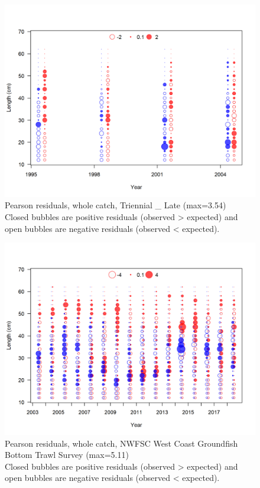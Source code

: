 \documentclass[12pt,]{article}
\begin{document}
\begin{figure}
\centering
\includegraphics{r4ss/plots_mod1/comp_lenfit_residsflt6mkt0.png}
\caption{Pearson residuals, whole catch, Triennial \_ Late (max=3.54)\\
Closed bubbles are positive residuals (observed \textgreater{} expected)
and open bubbles are negative residuals (observed \textless{} expected).
\label{fig:tri_late_len_pearson}}
\end{figure}

\begin{figure}
\centering
\includegraphics{r4ss/plots_mod1/comp_lenfit_residsflt7mkt0.png}
\caption{Pearson residuals, whole catch, NWFSC West Coast Groundfish
Bottom Trawl Survey (max=5.11)\\
Closed bubbles are positive residuals (observed \textgreater{} expected)
and open bubbles are negative residuals (observed \textless{} expected).
\label{fig:nwfsc_combo_len_pearson}}
\end{figure}
\end{document}
